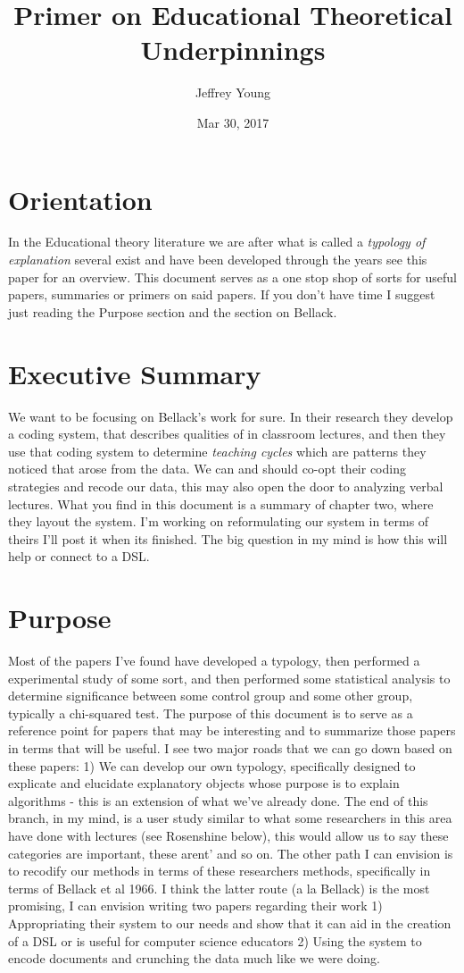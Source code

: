 \documentclass[10pt, letterpaper]{article}
\author{Jeffrey Young}
\date{Mar 30, 2017}
\title{Primer on Educational Theoretical Underpinnings}
\begin{document}
\maketitle

\section*{Orientation}
\label{sec:org52540a4}
In the Educational theory literature we are after what is called a \emph{typology of explanation} several exist and have been developed through the years see this paper \cite{brown1984explaining} for an overview. This document serves as a one stop shop of sorts for useful papers, summaries or primers on said papers. If you don't have time I suggest just reading the Purpose section and the section on Bellack.
\section*{Executive Summary}
\label{sec:orgf4920be}
We want to be focusing on Bellack's work for sure. In their research they develop a coding system, that describes qualities of in classroom lectures, and then they use that coding system to determine \emph{teaching cycles} which are patterns they noticed that arose from the data. We can and should co-opt their coding strategies and recode our data, this may also open the door to analyzing verbal lectures. What you find in this document is a summary of chapter two, where they layout the system. I'm working on reformulating our system in terms of theirs I'll post it when its finished. The big question in my mind is how this will help or connect to a DSL.

\section*{Purpose}
\label{sec:orgefe9b23}
Most of the papers I've found have developed a typology, then performed a experimental study of some sort, and then performed some statistical analysis to determine significance between some control group and some other group, typically a chi-squared test. The purpose of this document is to serve as a reference point for papers that may be interesting and to summarize those papers in terms that will be useful. I see two major roads that we can go down based on these papers: 1) We can develop our own typology, specifically designed to explicate and elucidate explanatory objects whose purpose is to explain algorithms - this is an extension of what we've already done. The end of this branch, in my mind, is a user study similar to what some researchers in this area have done with lectures (see Rosenshine below), this would allow us to say these categories are important, these arent' and so on. The other path I can envision is to recodify our methods in terms of these researchers methods, specifically in terms of Bellack et al 1966. I think the latter route (a la Bellack) is the most promising, I can envision writing two papers regarding their work 1) Appropriating their system to our needs and show that it can aid in the creation of a DSL or is useful for computer science educators 2) Using the system to encode documents and crunching the data much like we were doing.
\end{document}
